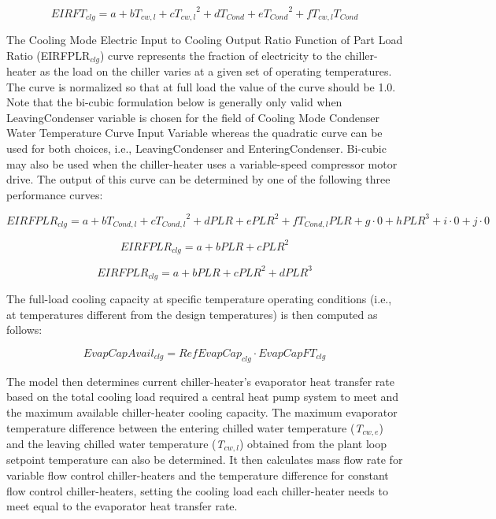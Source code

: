 \begin{equation}
EIRF{T_{clg}} = a + b{T_{cw,l}} + c{T_{cw,l}}^2 + d{T_{Cond}} + e{T_{Cond}}^2 + f{T_{cw,l}}{T_{Cond}}
\end{equation}

The Cooling Mode Electric Input to Cooling Output Ratio Function of Part Load Ratio (EIRFPLR\(_{clg}\)) curve represents the fraction of electricity to the chiller-heater as the load on the chiller varies at a given set of operating temperatures. The curve is normalized so that at full load the value of the curve should be 1.0. Note that the bi-cubic formulation below is generally only valid when LeavingCondenser variable is chosen for the field of Cooling Mode Condenser Water Temperature Curve Input Variable whereas the quadratic curve can be used for both choices, i.e., LeavingCondenser and EnteringCondenser. Bi-cubic may also be used when the chiller-heater uses a variable-speed compressor motor drive. The output of this curve can be determined by one of the following three performance curves:

\begin{equation}
EIRFPL{R_{clg}} = a + b{T_{Cond,l}} + c{T_{Cond,l}}^2 + dPLR + ePL{R^2} + f{T_{Cond,l}}PLR + g \cdot 0 + hPL{R^3} + i \cdot 0 + j \cdot 0
\end{equation}

\begin{equation}
EIRFPL{R_{clg}} = a + bPLR + cPL{R^2}
\end{equation}

\begin{equation}
EIRFPL{R_{clg}} = a + bPLR + cPL{R^2} + dPL{R^3}
\end{equation}

The full-load cooling capacity at specific temperature operating conditions (i.e., at temperatures different from the design temperatures) is then computed as follows:

\begin{equation}
EvapCapAvai{l_{clg}} = RefEvapCa{p_{clg}} \cdot EvapCapF{T_{clg}}
\end{equation}

The model then determines current chiller-heater's evaporator heat transfer rate based on the total cooling load required a central heat pump system to meet and the maximum available chiller-heater cooling capacity. The maximum evaporator temperature difference between the entering chilled water temperature (\emph{T\(_{cw,e}\)}) and the leaving chilled water temperature (\emph{T\(_{cw,l}\)}) obtained from the plant loop setpoint temperature can also be determined. It then calculates mass flow rate for variable flow control chiller-heaters and the temperature difference for constant flow control chiller-heaters, setting the cooling load each chiller-heater needs to meet equal to the evaporator heat transfer rate.

